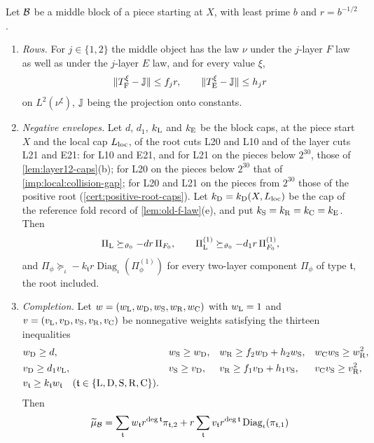\begin{lemma}\label{lem:front12:reference}
Let $\mathcal B$ be a middle block of a piece starting at $X$, with least prime $b$
and $r=b^{-1/2}$.
\begin{enumerate}[label=(\roman*)]
\item \emph{Rows.} For $j\in\{1,2\}$ the middle object has the law $\nu$
 under the $j$-layer $F$ law as well as under the $j$-layer $E$ law, and
 for every value $\xi$,
 \[
  \|T^\xi_{\rm F}-\mathbb J\|\le f_jr,\qquad \|T^\xi_{\rm E}-\mathbb J\|\le h_jr
 \]
 on $L^2(\nu^\xi)$, $\mathbb J$ being the projection onto constants.
\item \emph{Negative envelopes.} Let $d$, $d_1$, $k_{\rm L}$ and $k_{\rm E}$
 be the block caps, at the piece start $X$ and the local cap $L_{\rm loc}$, of
 the root cuts L20 and L10 and of the layer cuts L21 and E21: for L10 and
 E21, and for L21 on the pieces below $2^{30}$, those of
 \cref{lem:layer12-caps}(b); for L20 on the pieces below $2^{30}$ that of
 \cref{imp:local:collision-gap}; for L20 and L21 on the pieces from $2^{30}$ those
 of the positive root (\cref{cert:positive-root-caps}). Let $k_{\rm D}=k_{\rm D}(X,L_{\rm loc})$ be
 the cap of the reference fold record of \cref{lem:old-f-law}(e), and put
 $k_{\rm S}=k_{\rm R}=k_{\rm C}=k_{\rm E}$. Then
 \[
  \Pi_{\rm L}\succeq_{\vartheta_0}-dr\,\Pi_{F_0},\qquad
  \Pi^{(1)}_{\rm L}\succeq_{\vartheta_0}-d_1r\,\Pi^{(1)}_{F_0},
 \]
 and $\Pi_\phi\succeq_\iota-k_{\mathfrak t}r\operatorname{Diag}_\iota(\Pi^{(1)}_\phi)$
 for every two-layer component $\Pi_\phi$ of type $\mathfrak t$, the root
 included.
\item \emph{Completion.} Let $w=(w_{\rm L},w_{\rm D},w_{\rm S},w_{\rm R},w_{\rm C})$
 with $w_{\rm L}=1$ and $v=(v_{\rm L},v_{\rm D},v_{\rm S},v_{\rm R},v_{\rm C})$ be
 nonnegative weights satisfying the thirteen inequalities
 \begin{align*}
  &w_{\rm D}\ge d,&&w_{\rm S}\ge w_{\rm D},&&w_{\rm R}\ge f_2w_{\rm D}+h_2w_{\rm S},
   &&w_{\rm C}w_{\rm S}\ge w_{\rm R}^2,\\
  &v_{\rm D}\ge d_1v_{\rm L},&&v_{\rm S}\ge v_{\rm D},&&v_{\rm R}\ge f_1v_{\rm D}+h_1v_{\rm S},
   &&v_{\rm C}v_{\rm S}\ge v_{\rm R}^2,\\
  &v_{\mathfrak t}\ge k_{\mathfrak t}w_{\mathfrak t}\quad(\mathfrak t\in\{\rm L,D,S,R,C\}).
 \end{align*}
 Then
 \[
  \widetilde\mu_{\mathcal B}=\sum_{\mathfrak t}w_{\mathfrak t}r^{\deg\mathfrak t}\pi_{\mathfrak t,2}
   +r\sum_{\mathfrak t}v_{\mathfrak t}r^{\deg\mathfrak t}\operatorname{Diag}_\iota(\pi_{\mathfrak t,1})
\]
\end{enumerate}
\end{lemma}
